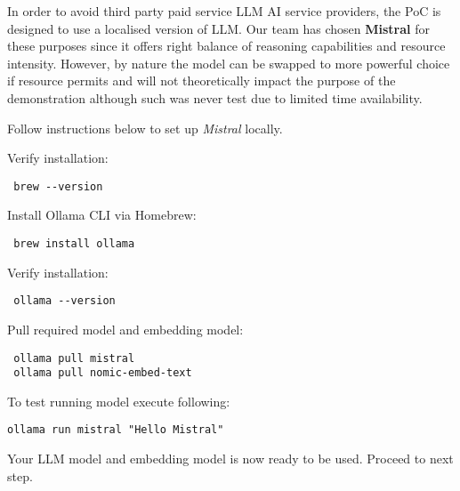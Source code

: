 

In order to avoid third party paid service LLM AI service providers, the PoC is designed to use a localised version of LLM.
Our team has chosen \textbf{Mistral} for these purposes since it offers right balance of reasoning capabilities and resource intensity.
However, by nature the model can be swapped to more powerful choice if resource permits and will not theoretically impact the purpose of the demonstration
although such was never test due to limited time availability.

Follow instructions below to set up \emph{Mistral} locally.


Verify installation:
\begin{lstlisting}
 brew --version
\end{lstlisting}

Install Ollama CLI via Homebrew:
\begin{lstlisting}
 brew install ollama
\end{lstlisting}

Verify installation:
\begin{lstlisting}
 ollama --version
\end{lstlisting}

Pull required model and embedding model:
\begin{lstlisting}
 ollama pull mistral
 ollama pull nomic-embed-text
\end{lstlisting}

To test running model execute following:
\begin{lstlisting}
ollama run mistral "Hello Mistral"
\end{lstlisting}

Your LLM model and embedding model is now ready to be used. Proceed to next step.
